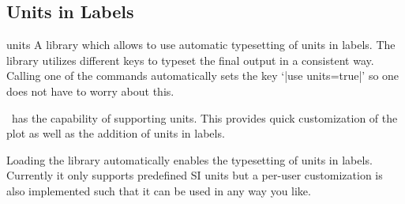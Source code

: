 \subsection{Units in Labels}
\label{sec:units}

{}

\begin{pgfplotslibrary}{units}
  A library which allows to use automatic typesetting of units in labels. The library utilizes different keys to typeset the final output in a consistent way.
  Calling one of the commands automatically sets the key `|use units=true|' so one does not have to worry about this.
\end{pgfplotslibrary}
\PGFPlots\ has the capability of supporting units. This provides quick customization of the plot as well as the addition of units in labels. 

Loading the library automatically enables the typesetting of units in labels. Currently it only supports predefined SI units but a per-user customization is also
implemented such that it can be used in any way you like.

